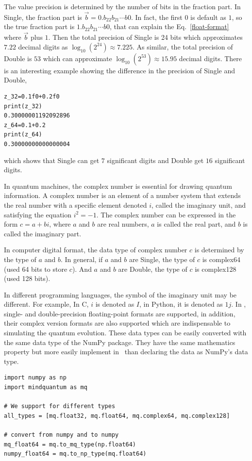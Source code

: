 The value precision is determined by the number of bits in the fraction part.
In Single, the fraction part is $\vec{b}=0.b_{22}b_{21}\cdots b{0}$.
In fact, the first $0$ is default as $1$, so the true fraction part is $1.b_{22}b_{21}\cdots b{0}$, that can explain the Eq.~\eqref{float-format} where $\vec{b}$ plus $1$.
Then the total precision of Single is 24 bits which approximates $7.22$ decimal digits as $\log_{10}(2^{24}) \approx 7.225$.
As similar, the total precision of Double is $53$ which can approximate $\log_{10}(2^{53}) \approx 15.95$ decimal digits.
There is an interesting example showing the difference in the precision of Single and Double,
\begin{lstlisting}
z_32=0.1f0+0.2f0
print(z_32)
0.30000001192092896
z_64=0.1+0.2
print(z_64)
0.30000000000000004
\end{lstlisting}
which shows that Single can get $7$ significant digits and Double get $16$ significant digits.


In quantum machines, the complex number is essential for drawing quantum information. A complex number is an element of a number system that extends the real number with a specific element denoted $i$, called the imaginary unit, and satisfying the equation $i^2=-1$.
The complex number can be expressed in the form $c=a+bi$, where $a$ and $b$ are real numbers, $a$ is called the real part, and $b$ is called the imaginary part.

In computer digital format, the data type of complex number $c$ is determined by the type of $a$ and $b$.
In general, if $a$ and $b$ are Single, the type of $c$ is complex64 (used 64 bits to store $c$). And $a$ and $b$ are Double, the type of $c$ is complex128 (used 128 bits).

In different programming languages, the symbol of the imaginary unit may be different.
For example, In C, $i$ is denoted as $I$, in Python, it is denoted as $1j$.
In \MindQuantum, single- and double-precision floating-point formats are supported, in addition, their complex version formats are also supported which are indispensable to simulating the quantum evolution.
These data types can be easily converted with the same data type of the NumPy \cite{harris2020array} package. They have the same mathematics property but more easily implement in \MindQuantum\ than declaring the data as NumPy's data type.

\begin{lstlisting}
import numpy as np
import mindquantum as mq

# We support for different types
all_types = [mq.float32, mq.float64, mq.complex64, mq.complex128]

# convert from numpy and to numpy
mq_float64 = mq.to_mq_type(np.float64)
numpy_float64 = mq.to_np_type(mq.float64)
\end{lstlisting}

